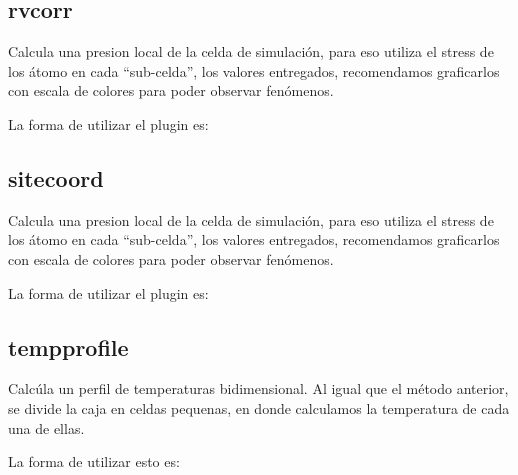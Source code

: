 \subsection{rvcorr}

Calcula una presion local de la celda de simulaci\'on, para eso utiliza el
stress de los \'atomo en cada ``sub-celda'', los valores entregados,
recomendamos graficarlos con escala de colores para poder observar fen\'omenos. 

La forma de utilizar el plugin es:

\subsection{sitecoord}

Calcula una presion local de la celda de simulaci\'on, para eso utiliza el
stress de los \'atomo en cada ``sub-celda'', los valores entregados,
recomendamos graficarlos con escala de colores para poder observar fen\'omenos. 

La forma de utilizar el plugin es:


\subsection{tempprofile}
Calc\'ula un perfil de temperaturas bidimensional. Al igual que el m\'etodo
anterior, se divide la caja en celdas pequenas, en donde calculamos la
temperatura de cada una de ellas.

La forma de utilizar esto es:


